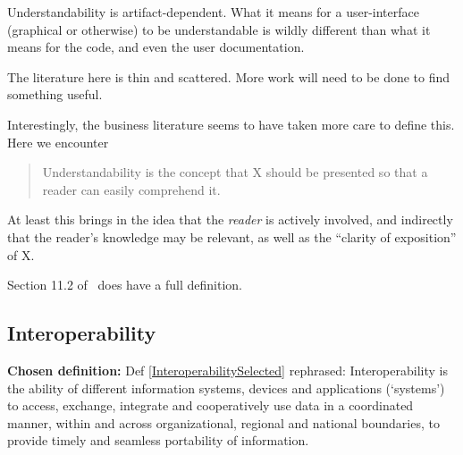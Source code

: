 \documentclass[letterpaper,cleveref]{lipics-v2019}
\theoremstyle{definition}
\begin{document}
Understandability is artifact-dependent. What it means for a user-interface (graphical
or otherwise) to be understandable is wildly different than what it means for the code,
and even the user documentation.

The literature here is thin and scattered.  More work will need to be done to find
something useful.

Interestingly, the business literature seems to have taken more care to define this.
Here we encounter
\begin{quote}
Understandability is the concept that X should be presented
so that a reader can easily comprehend it.
\end{quote}
At least this brings in the idea that the \emph{reader} is actively involved, and
indirectly that the reader's knowledge may be relevant, as well as the
``clarity of exposition'' of X.

Section 11.2 of~\cite{adams2015nonfunctional} does have a full definition.

\subsection{Interoperability}
\noindent \textbf{Chosen definition:} Def \ref{InteroperabilitySelected}
rephrased: Interoperability is the ability of different information systems,
devices and applications (‘systems’) to access, exchange, integrate and
cooperatively use data in a coordinated manner, within and across
organizational, regional and national boundaries, to provide timely and seamless
portability of information.
\end{document}
